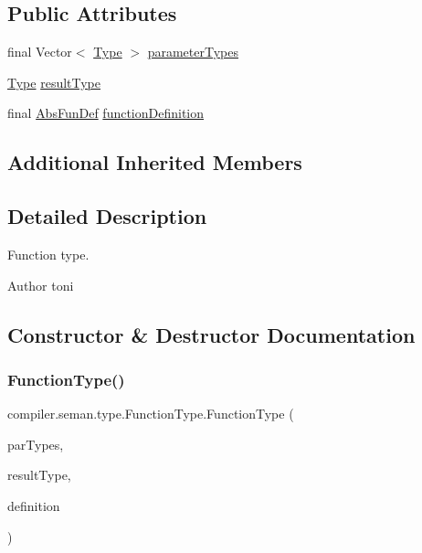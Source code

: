 \subsection*{Public Attributes}
\begin{DoxyCompactItemize}
\item 
final Vector$<$ \hyperlink{classcompiler_1_1seman_1_1type_1_1_type}{Type} $>$ \hyperlink{classcompiler_1_1seman_1_1type_1_1_function_type_a71e8fb6bfac39970dfea1a60a6235b63}{parameter\+Types}
\item 
\hyperlink{classcompiler_1_1seman_1_1type_1_1_type}{Type} \hyperlink{classcompiler_1_1seman_1_1type_1_1_function_type_a781f4364598c24eea8f9de8e92250386}{result\+Type}
\item 
final \hyperlink{classcompiler_1_1abstr_1_1tree_1_1def_1_1_abs_fun_def}{Abs\+Fun\+Def} \hyperlink{classcompiler_1_1seman_1_1type_1_1_function_type_a1ac3893ce40c852102969a2d830fe630}{function\+Definition}
\end{DoxyCompactItemize}
\subsection*{Additional Inherited Members}


\subsection{Detailed Description}
Function type.

\begin{DoxyAuthor}{Author}
toni 
\end{DoxyAuthor}


\subsection{Constructor \& Destructor Documentation}
\mbox{\label{classcompiler_1_1seman_1_1type_1_1_function_type_ae96461b609ab8e93d1bfd5bce5061620}} 
\subsubsection{\texorpdfstring{Function\+Type()}{FunctionType()}}
{\footnotesize\ttfamily compiler.\+seman.\+type.\+Function\+Type.\+Function\+Type (\begin{DoxyParamCaption}\item[{Vector$<$ \hyperlink{classcompiler_1_1seman_1_1type_1_1_type}{Type} $>$}]{par\+Types,  }\item[{\hyperlink{classcompiler_1_1seman_1_1type_1_1_type}{Type}}]{result\+Type,  }\item[{\hyperlink{classcompiler_1_1abstr_1_1tree_1_1def_1_1_abs_fun_def}{Abs\+Fun\+Def}}]{definition }\end{DoxyParamCaption})}

